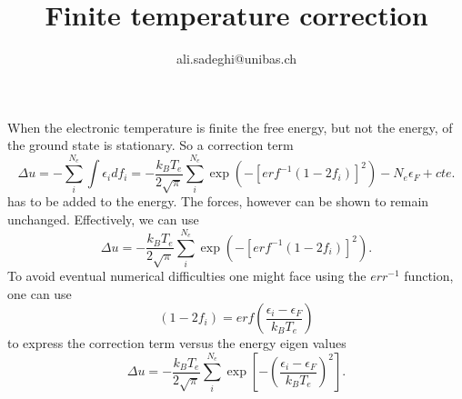 \documentclass[a4paper,10pt]{article}
\title { Finite temperature correction}
\author {ali.sadeghi@unibas.ch}
\begin{document}
\maketitle


When the electronic temperature is finite the free energy, but not the energy, of the ground state is stationary.
So a correction term  
\[
 \Delta u = -\sum_i^{N_e} \int \epsilon_i df_i
   = - \frac{k_B T_e}{2 \sqrt{\pi}} \sum_i^{N_e} \exp \left(-[erf^{-1}(1-2f_i)]^2\right) - N_e \epsilon_F+cte.
\]
has to be added to the energy. The forces, however can be shown to remain unchanged.
Effectively, we can use 
\[
\Delta u = - \frac{k_B T_e}{2 \sqrt{\pi}} \sum_i^{N_e} \exp \left(-[erf^{-1}(1-2f_i)]^2\right).
\]
To avoid eventual numerical difficulties one might face using the  $err^{-1}$ function,  one can use  
\[(1-2f_i)=erf(\frac{\epsilon_i-\epsilon_F}{k_B T_e}) \] 
to express the correction term versus the energy eigen values
\[ {\Delta u = - \frac{k_B T_e}{2 \sqrt{\pi}} \sum_i^{N_e} \exp [-(\frac{\epsilon_i-\epsilon_F}{k_B T_e})^2]}.
\]
\end{document}
